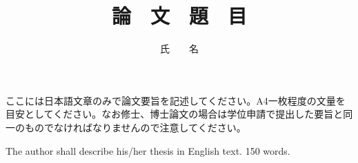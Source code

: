 \documentclass[a4paper,uplatex]{jsarticle}
\begin{document}


\bachelorthesis %

\title{論　文　題　目}
\author{氏　　名} %

\maketitle

\setcounter{page}{1} %

ここには日本語文章のみで論文要旨を記述してください。A4一枚程度の文量を目安としてください。なお修士、博士論文の場合は学位申請で提出した要旨と同一のものでなければなりませんので注意してください。

The author shall describe his/her thesis in English text. 150 words.

\makemokuji %
\end{document}
